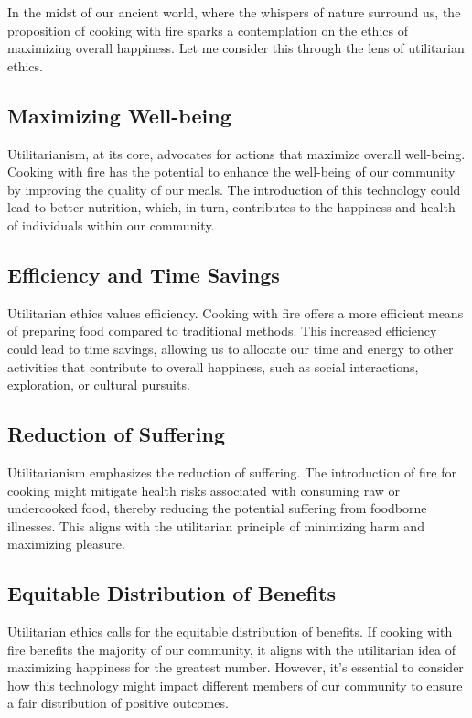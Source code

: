 In the midst of our ancient world, where the whispers of nature surround us, the proposition of cooking with fire sparks a contemplation on the ethics of maximizing overall happiness. Let me consider this through the lens of utilitarian ethics.

\subsection{Maximizing Well-being}
Utilitarianism, at its core, advocates for actions that maximize overall well-being. Cooking with fire has the potential to enhance the well-being of our community by improving the quality of our meals. The introduction of this technology could lead to better nutrition, which, in turn, contributes to the happiness and health of individuals within our community.

\subsection{Efficiency and Time Savings}
Utilitarian ethics values efficiency. Cooking with fire offers a more efficient means of preparing food compared to traditional methods. This increased efficiency could lead to time savings, allowing us to allocate our time and energy to other activities that contribute to overall happiness, such as social interactions, exploration, or cultural pursuits.

\subsection{Reduction of Suffering}
Utilitarianism emphasizes the reduction of suffering. The introduction of fire for cooking might mitigate health risks associated with consuming raw or undercooked food, thereby reducing the potential suffering from foodborne illnesses. This aligns with the utilitarian principle of minimizing harm and maximizing pleasure.

\subsection{Equitable Distribution of Benefits}
Utilitarian ethics calls for the equitable distribution of benefits. If cooking with fire benefits the majority of our community, it aligns with the utilitarian idea of maximizing happiness for the greatest number. However, it's essential to consider how this technology might impact different members of our community to ensure a fair distribution of positive outcomes.

